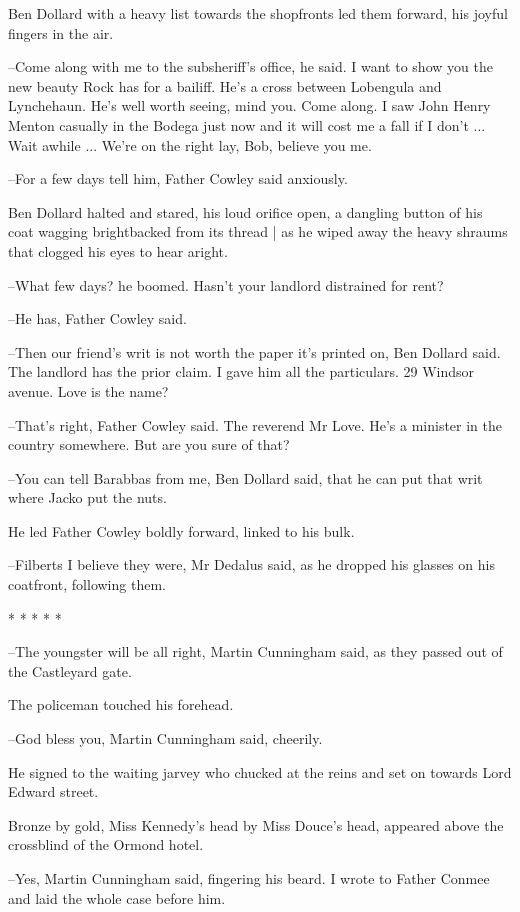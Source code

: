 Ben Dollard with a heavy list towards the shopfronts led them forward,
his joyful fingers in the air.

--Come along with me to the subsheriff's office, he said. I want to show
you the new beauty Rock has for a bailiff. He's a cross between Lobengula
and Lynchehaun. He's well worth seeing, mind you. Come along. I saw John
Henry Menton casually in the Bodega just now and it will cost me a fall
if I don't ... Wait awhile ... We're on the right lay, Bob, believe you
me.

--For a few days tell him, Father Cowley said anxiously.

Ben Dollard halted and stared,
his loud orifice open,
a dangling button of his coat wagging brightbacked from its thread |
as he wiped away the heavy shraums that clogged his eyes to hear aright.

--What few days? he boomed. Hasn't your landlord distrained for rent?

--He has, Father Cowley said.

--Then our friend's writ is not worth the paper it's printed on, Ben
Dollard said. The landlord has the prior claim. I gave him all the
particulars. 29 Windsor avenue. Love is the name?

--That's right, Father Cowley said. The reverend Mr Love. He's a minister
in the country somewhere. But are you sure of that?

--You can tell Barabbas from me,
Ben Dollard said,
that he can put that writ where Jacko put the nuts.

He led Father Cowley boldly forward, linked to his bulk.

--Filberts I believe they were, Mr Dedalus said, as he dropped his
glasses on his coatfront, following them.


    * * * * *


--The youngster will be all right, Martin Cunningham said, as they passed
out of the Castleyard gate.

The policeman touched his forehead.

--God bless you, Martin Cunningham said, cheerily.

He signed to the waiting jarvey
who chucked at the reins and set on towards Lord Edward street.

Bronze by gold, Miss Kennedy's head by Miss Douce's head, appeared above
the crossblind of the Ormond hotel.

--Yes, Martin Cunningham said, fingering his beard. I wrote to Father
Conmee and laid the whole case before him.

